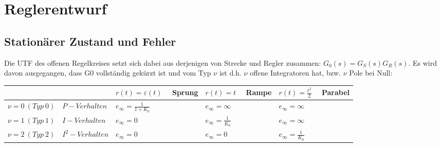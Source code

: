 \section{Reglerentwurf}
\subsection{Stationärer Zustand und Fehler}
Die UTF des offenen Regelkreises setzt sich dabei aus derjenigen von Strecke
und Regler zusammen: $G_0(s) = G_S(s)G_R(s)$. Es wird davon ausgegangen, dass G0
vollständig gekürzt ist und vom Typ $\nu$ ist d.h. $\nu$ offene Integratoren hat, bzw. $\nu$ Pole
bei Null:
\begin{table}[h!]
	\begin{tabularx}{\textwidth}{|l||X|X|X|}
	\hline
		& $r(t)=\varepsilon(t) \quad $ Sprung & $r(t)=t \quad$ Rampe & $r(t)=\frac{t^2}{2} \quad$ Parabel \\ \hline\hline
		$\nu =0 \ (Typ \ 0) \quad P-Verhalten$ & $e_\infty=\frac{1}{1+K_0}$ & $e_\infty=\infty$ & $e_\infty=\infty$ \\ \hline
		$\nu =1 \ (Typ \ 1) \quad  I-Verhalten$ & $e_\infty=0$ & $e_\infty=\frac{1}{K_0}$ & $e_\infty=\infty$ \\ \hline
		$\nu =2 \ (Typ \ 2) \quad  I^2-Verhalten$ & $e_\infty=0$ & $e_\infty=0$ & $e_\infty=\frac{1}{K_0}$ \\ \hline
	\end{tabularx}
\end{table}
